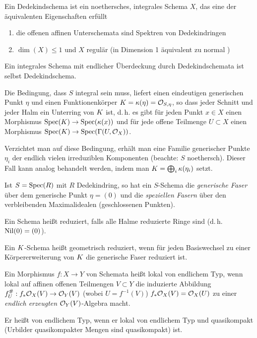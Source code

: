 \documentclass[german]{scrreprt}
\begin{document}
\begin{Definition}[Dedekindschema]
Ein Dedekindschema ist ein noethersches, integrales Schema $X$, das
eine der äquivalenten Eigenschaften erfüllt
\begin{enumerate}[label=(\roman*)]
\item die offenen affinen Unterschemata sind Spektren von Dedekindringen
\item $\dim(X)\leq 1$ und $X$ regulär
  (in Dimension 1 äquivalent zu normal
  \cite[Corollary 6.39, Proposition 6.40]{wedhorn})
\end{enumerate}
Ein integrales Schema mit endlicher Überdeckung durch Dedekindschemata
ist selbst Dedekindschema.
\cite[Chapter (7.13)]{wedhorn}

\begin{Bemerkung}
Die Bedingung, dass $S$ integral sein muss, liefert einen eindeutigen
generischen Punkt $\eta$ und einen Funktionenkörper
$K=\kappa(\eta)=\mathcal{O}_{S,\eta}$, so dass jeder Schnitt und jeder Halm ein
Unterring von $K$ ist, d.\,h. es gibt für jeden Punkt $x\in X$ einen
Morphismus $\operatorname{Spec}(K)\to\operatorname{Spec}(\kappa(x))$ und für jede offene Teilmenge
$U\subset X$ einen Morphismus $\operatorname{Spec}(K)\to\operatorname{Spec}(\Gamma(U,\mathcal{O}_X))$.

Verzichtet man auf diese Bedingung, erhält man eine Familie
generischer Punkte $\eta_i$ der endlich vielen irreduziblen
Komponenten (beachte: $S$ noethersch). Dieser Fall kann analog
behandelt werden, indem man $K=\bigoplus_i \kappa(\eta_i)$ setzt.
\end{Bemerkung}

\begin{Bemerkung}
  Ist $S=\operatorname{Spec}(R)$ mit $R$ Dedekindring, so hat ein $S$-Schema die
  \emph{generische Faser} über dem generische Punkt $\eta=(0)$ und die
  \emph{speziellen Fasern} über den verbleibenden Maximalidealen
  (geschlossenen Punkten).
\end{Bemerkung}
\end{Definition}

\begin{Definition}
  Ein Schema heißt reduziert, falls alle Halme reduzierte Ringe sind
  (d.\,h. $\operatorname{Nil}(0)=(0)$).

  Ein $K$-Schema heißt geometrisch reduziert, wenn für jeden
  Basiswechsel zu einer Körpererweiterung von $K$ die generische
  Faser reduziert ist. 
\end{Definition}

\begin{Definition}
Ein Morphismus $f\colon X\to Y$ von Schemata heißt lokal von endlichem
Typ, wenn lokal auf affinen offenen Teilmengen $V\subset Y$ die
induzierte Abbildung $f_U^\#: f_\ast\mathcal{O}_X(V)\to \mathcal{O}_Y(V)$
(wobei $U=f^{-1}(V)$) $f_\ast\mathcal{O}_X(V)=\mathcal{O}_X(U)$ zu einer \emph{endlich erzeugten}
$\mathcal{O}_Y(V)$-Algebra macht.

Er heißt von endlichem Typ, wenn er lokal von endlichem Typ und
quasikompakt (Urbilder quasikompakter Mengen sind quasikompakt) ist.
\end{Definition}
\end{document}
